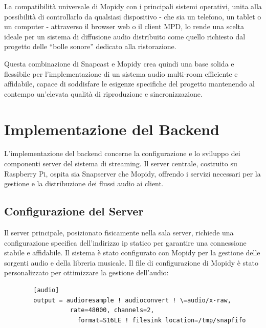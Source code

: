 La compatibilità universale di Mopidy con i principali sistemi operativi, unita alla possibilità di controllarlo da qualsiasi dispositivo - che sia un telefono, un tablet o un computer - attraverso il browser web o il client MPD, lo rende una scelta ideale per un sistema di diffusione audio distribuito come quello richiesto dal progetto delle “bolle sonore” dedicato alla ristorazione.

Questa combinazione di Snapcast e Mopidy crea quindi una base solida e flessibile per l'implementazione di un sistema audio multi-room efficiente e affidabile, capace di soddisfare le esigenze specifiche del progetto mantenendo al contempo un'elevata qualità di riproduzione e sincronizzazione.

\section{Implementazione del Backend}
\noindent


L'implementazione del backend concerne la configurazione e lo sviluppo dei componenti server del sistema di streaming. Il server centrale, costruito su Raspberry Pi, ospita sia Snapserver che Mopidy, offrendo i servizi necessari per la gestione e la distribuzione dei flussi audio ai client.

\subsection{Configurazione del Server}

Il server principale, posizionato fisicamente nella sala server, richiede una configurazione specifica dell'indirizzo \gls{ip} statico per garantire una connessione stabile e affidabile. Il sistema è stato configurato con Mopidy per la gestione delle sorgenti audio e della libreria musicale. Il file di configurazione di Mopidy è stato personalizzato per ottimizzare la gestione dell'audio:


  \begin{table}[H]
    \begin{algorithm}[H]
      \caption{}
      \BlankLine
      \begin{verbatim}
        [audio]
        output = audioresample ! audioconvert ! \=audio/x-raw,
                  rate=48000, channels=2,
                    format=S16LE ! filesink location=/tmp/snapfifo
      \end{verbatim}
    \end{algorithm}
    \caption{Esempio di configurazione della pipeline audio di Mopidy.}
    \end{table}

